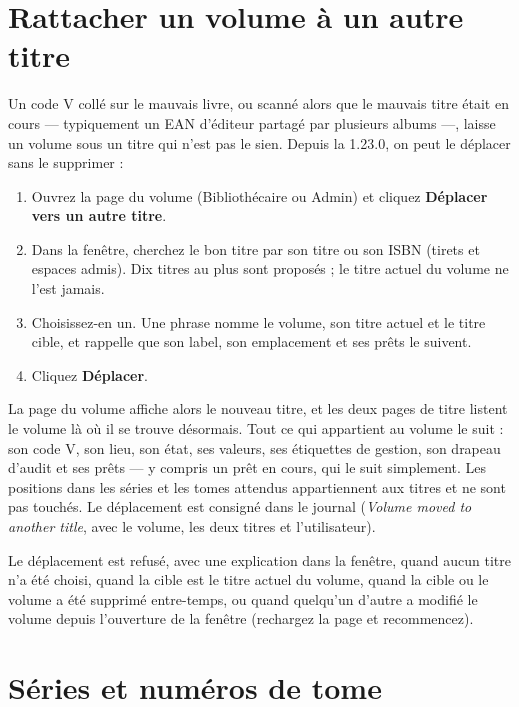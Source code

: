 \section{Rattacher un volume à un autre titre}\label{sec:move-volume-title}

Un code V collé sur le mauvais livre, ou scanné alors que le mauvais
titre était en cours --- typiquement un EAN d'éditeur partagé par
plusieurs albums ---, laisse un volume sous un titre qui n'est pas le
sien. Depuis la 1.23.0, on peut le déplacer sans le supprimer :

\begin{enumerate}
  \item Ouvrez la page du volume (Bibliothécaire ou Admin) et cliquez
        \textbf{Déplacer vers un autre titre}.
  \item Dans la fenêtre, cherchez le bon titre par son titre ou son
        ISBN (tirets et espaces admis). Dix titres au plus sont
        proposés ; le titre actuel du volume ne l'est jamais.
  \item Choisissez-en un. Une phrase nomme le volume, son titre actuel
        et le titre cible, et rappelle que son label, son emplacement
        et ses prêts le suivent.
  \item Cliquez \textbf{Déplacer}.
\end{enumerate}

La page du volume affiche alors le nouveau titre, et les deux pages de
titre listent le volume là où il se trouve désormais. Tout ce qui
appartient au volume le suit : son code V, son lieu, son état, ses
valeurs, ses étiquettes de gestion, son drapeau d'audit et ses prêts
--- y compris un prêt en cours, qui le suit simplement. Les positions
dans les séries et les tomes attendus appartiennent aux titres et ne
sont pas touchés. Le déplacement est consigné dans le journal
(\emph{Volume moved to another title}, avec le volume, les deux titres
et l'utilisateur).

Le déplacement est refusé, avec une explication dans la fenêtre,
quand aucun titre n'a été choisi, quand la cible est le titre actuel du
volume, quand la cible ou le volume a été supprimé entre-temps, ou quand
quelqu'un d'autre a modifié le volume depuis l'ouverture de la fenêtre
(rechargez la page et recommencez).

\section{Séries et numéros de tome}\label{sec:tome-number}

